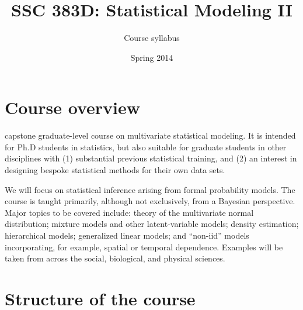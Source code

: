 \documentclass{mynotes}
\title{SSC 383D: Statistical Modeling II}
\author{Course syllabus}
\date{Spring 2014}  %
\begin{document}
\maketitle%

\section{Course overview}



 capstone graduate-level course on multivariate statistical modeling.  It is intended for Ph.D students in statistics, but also suitable for graduate students in other disciplines with (1) substantial previous statistical training, and (2) an interest in designing bespoke statistical methods for their own data sets.

We will focus on statistical inference arising from formal probability models.  The course is taught primarily, although not exclusively, from a Bayesian perspective.  Major topics to be covered include: theory of the multivariate normal distribution; mixture models and other latent-variable models; density estimation; hierarchical models; generalized linear models; and ``non-iid'' models incorporating, for example, spatial or temporal dependence.  Examples will be taken from across the social, biological, and physical sciences.

\section{Structure of the course}
\end{document}
